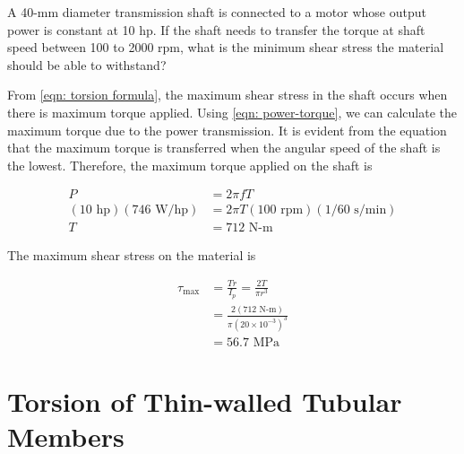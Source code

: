 \documentclass[
fontsize=10pt,
a4paper,
twosides=false,
open=any,
svgnames,
]{kaobook} %
\begin{document}
\begin{example}
  A 40-mm diameter transmission shaft is connected to a motor whose output power is constant at 10 hp.  If the shaft needs to transfer the torque at shaft speed between 100 to 2000 rpm, what is the minimum shear stress the material should be able to withstand?
  
    \begin{figure}[H]
    \centering
  \end{figure}
  
From \cref{eqn: torsion formula}, the maximum shear stress in the shaft occurs when there is maximum torque applied. Using \cref{eqn: power-torque}, we can calculate the maximum torque due to the power transmission. It is evident from the equation that the maximum torque is transferred when the angular speed of the shaft is the lowest. Therefore, the maximum torque applied on the shaft is

\begin{align*}
  P &= 2\pi fT \\ 
  (10 \text{ hp})(746 \text{ W/hp}) &= 2\pi T (100 \text{ rpm})(1/60 \text{ s/min}) \\ 
  T &= 712 \text{ N-m}
\end{align*}	

The maximum shear stress on the material is

\begin{align*}
  {\tau _{\max }} &= \frac{{Tr}}{{{I_p}}} = \frac{{2T}}{{\pi {r^3}}} \\[5pt]
                  &= \frac{2(712 \text{ N-m})}{\pi (20 \times 10^{ - 3})^3} \\[5pt]
                  &= 56.7 \text{ MPa}  
\end{align*}
\end{example}

\section{Torsion of Thin-walled Tubular Members}
\end{document}
